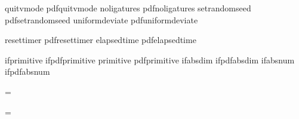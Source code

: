 \bindprimitive quitvmode      pdfquitvmode
\bindprimitive noligatures    pdfnoligatures
\bindprimitive setrandomseed  pdfsetrandomseed
\bindprimitive uniformdeviate pdfuniformdeviate

\bindprimitive resettimer     pdfresettimer
\bindprimitive elapsedtime    pdfelapsedtime


\bindprimitive ifprimitive    ifpdfprimitive
\bindprimitive primitive      pdfprimitive
\bindprimitive ifabsdim       ifpdfabsdim
\bindprimitive ifabsnum       ifpdfabsnum

\ifnum\texengine=\xetexengine \else %

    \pdfminorversion \plusfive

    \ifdefined\pdfcompresslevel     \else \newcount\pdfcompresslevel      \fi
    \ifdefined\pdfobjcompresslevel  \else \newcount\pdfobjcompresslevel   \fi
    \ifdefined\pdfgentounicode      \else \newcount\pdfgentounicode       \fi \pdfgentounicode      \plusone
    \ifdefined\pdfinclusioncopyfonts\else \newcount\pdfinclusioncopyfonts \fi \pdfinclusioncopyfonts\plusone

    \def\nopdfcompression     {\pdfobjcompresslevel\zerocount \pdfcompresslevel\zerocount}
    \def\maximumpdfcompression{\pdfobjcompresslevel\plusnine  \pdfcompresslevel\plusnine }
    \def\normalpdfcompression {\pdfobjcompresslevel\plusthree \pdfcompresslevel\plusthree}

    \normalpdfcompression

    \let\normalsetrandomseed \setrandomseed
    \let\normaluniformdeviate\uniformdeviate

\fi


\ifnum\texengine=\luatexengine
    \ifdefined\suppresslongerror %
        \suppresslongerror\plusone
    \fi
\fi


\newif\ifproductionrun


\ifx\pdftexversion\undefined \newcount\pdfoutput \fi {}


\ifx\fmtname   \undefined {} \fi
\ifx\fmtversion\undefined \def\fmtversion{3.1415926}                   \fi

